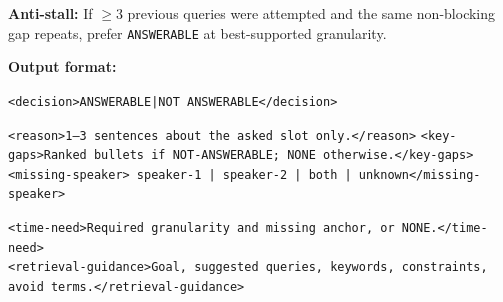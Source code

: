 \begin{table}[t]
\caption{The prompt template used for Meta-Thinker answerability checking (Part 2).}
\begin{promptbox}
\noindent\textbf{Anti-stall:} If $\geq$3 previous queries were attempted and the same non-blocking gap repeats, prefer \texttt{ANSWERABLE} at best-supported granularity.

\medskip

\noindent\textbf{Output format:}

\texttt{<decision>ANSWERABLE|NOT ANSWERABLE</decision>}

\texttt{<reason>1--3 sentences about the asked slot only.</reason>}
\texttt{<key-gaps>Ranked bullets if NOT-ANSWERABLE; NONE otherwise.</key-gaps>}\\
\texttt{<missing-speaker> speaker-1 | speaker-2 | both | unknown</missing-speaker>}

\texttt{<time-need>Required granularity and missing anchor, or NONE.</time-need>}\\
\texttt{<retrieval-guidance>Goal, suggested queries, keywords, constraints, avoid terms.</retrieval-guidance>}
\end{promptbox}
\label{tab:prompt_answerability_output}
\end{table}

